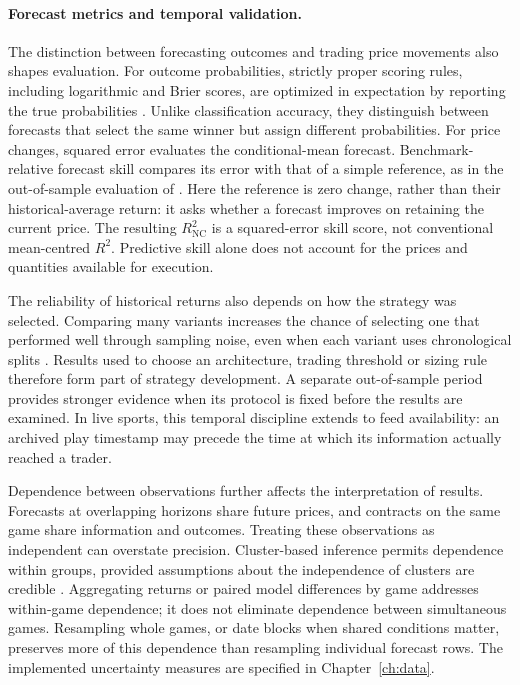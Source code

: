 \documentclass[12pt,a4paper,oneside]{report}
\begin{document}
\paragraph{Forecast metrics and temporal validation.}
The distinction between forecasting outcomes and trading price movements also
shapes evaluation. For outcome probabilities, strictly proper scoring rules,
including logarithmic and Brier scores, are optimized in expectation by reporting
the true probabilities \citep{gneiting2007strictly}. Unlike classification
accuracy, they distinguish between forecasts that select the same winner but
assign different probabilities. For price changes, squared error evaluates the
conditional-mean forecast. Benchmark-relative forecast skill compares its error
with that of a simple reference, as in the out-of-sample evaluation of
\citet{campbell2008predicting}. Here the reference is zero change, rather than
their historical-average return: it asks whether a forecast improves on retaining
the current price. The resulting $R^2_{\mathrm{NC}}$ is a squared-error skill
score, not conventional mean-centred $R^2$. Predictive skill alone does not
account for the prices and quantities available for execution.

The reliability of historical returns also depends on how the strategy was
selected. Comparing many variants increases the chance of selecting one that
performed well through sampling noise, even when each variant uses chronological
splits \citep{bailey2014pseudo,lopezdeprado2018advances}. Results used to choose
an architecture, trading threshold or sizing rule therefore form part of
strategy development. A separate out-of-sample period
provides stronger evidence when its protocol is fixed before the results are
examined. In live sports, this temporal discipline extends to feed availability:
an archived play timestamp may precede the time at which its information
actually reached a trader.

Dependence between observations further affects the interpretation of results.
Forecasts at overlapping horizons share future prices, and contracts on the
same game share information and outcomes. Treating these observations as
independent can overstate precision. Cluster-based inference permits dependence
within groups, provided assumptions about the independence of clusters are
credible \citep{cameron2015practitioner}. Aggregating returns or paired model
differences by game addresses within-game dependence; it does not eliminate
dependence between simultaneous games. Resampling whole games, or date blocks
when shared conditions matter, preserves more of this dependence than resampling
individual forecast rows. The implemented uncertainty measures are specified in
Chapter~\ref{ch:data}.
\end{document}
